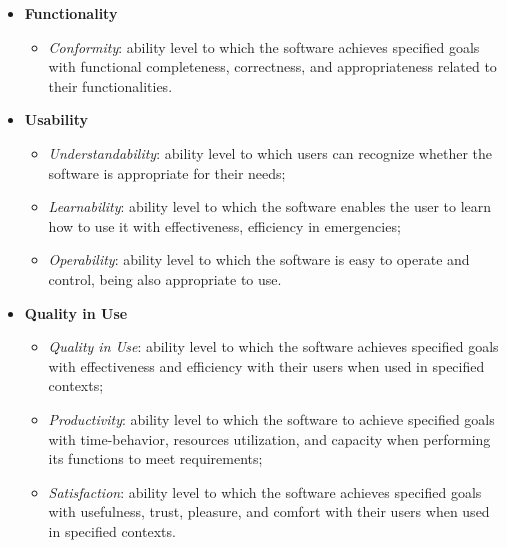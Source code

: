 \begin{itemize}
    \item \textbf{Functionality} 
        \begin{itemize}
            \item \textit{Conformity}: ability level to which the software achieves specified goals with functional completeness, correctness, and appropriateness related to their functionalities.
        \end{itemize}
    \item \textbf{Usability}
        \begin{itemize}
            \item \textit{Understandability}: ability level to which users can recognize whether the software is appropriate for their needs; 
            \item \textit{Learnability}: ability level to which the software enables the user to learn how to use it with effectiveness, efficiency in emergencies;
            \item \textit{Operability}: ability level to which the software is easy to operate and control, being also appropriate to use.
        \end{itemize}
    \item \textbf{Quality in Use}
        \begin{itemize}
            \item \textit{Quality in Use}: ability level to which the software achieves specified goals with effectiveness and efficiency with their users when used in specified contexts;
            \item \textit{Productivity}: ability level to which the software to achieve specified goals with time-behavior, resources utilization, and capacity when performing its functions to meet requirements;
            \item \textit{Satisfaction}: ability level to which the software achieves specified goals with usefulness, trust, pleasure, and comfort with their users when used in specified contexts.
        \end{itemize}
\end{itemize}


